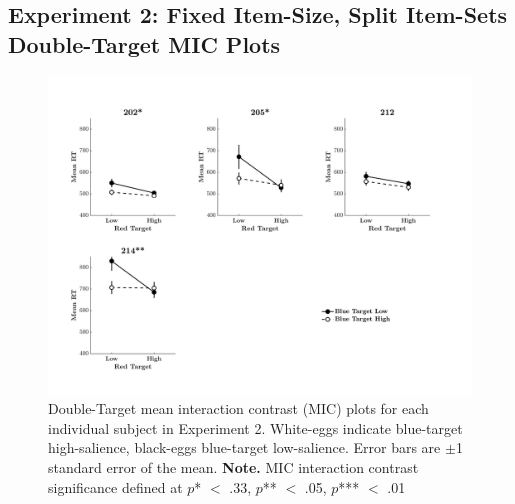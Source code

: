 \subsection{Experiment 2: Fixed Item-Size, Split Item-Sets Double-Target MIC Plots}
\begin{figure}[htb]
\begin{center}
\includegraphics[width=\linewidth]{Figures/Appendix/FIG28PNG.png}
\caption{Double-Target mean interaction contrast (MIC) plots for each individual subject in Experiment 2. White-eggs indicate blue-target high-salience, black-eggs blue-target low-salience. Error bars are $\pm$1 standard error of the mean. \newline
\textbf{Note.} MIC interaction contrast significance defined at $p$* $<$ .33, $p$** $<$ .05, $p$*** $<$ .01}
\label{fig:Indiv_MIC_AB_Ex2}
\end{center}
\end{figure}
\newpage


